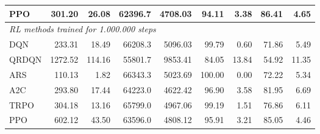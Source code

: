 \begin{samepage}
\begin{center}
\begin{tabular}{l|rr|rr|rr|rr}
    PPO          &   301.20 &    26.08 &    62396.7 &    4708.03 &   94.11 &    3.38 &   86.41 &    4.65 \\
    \midrule
    \multicolumn{9}{l}{\textit{RL methods trained for 1.000.000 steps}} \\
    \midrule
    DQN          &   233.31 &    18.49 &    66208.3 &    5096.03 &   99.79 &    0.60 &   71.86 &    5.49 \\
    QRDQN        &  1272.52 &   114.16 &    55801.7 &    9853.41 &   84.05 &   13.84 &   54.92 &   11.35 \\
    ARS          &   110.13 &     1.82 &    66343.3 &    5023.69 &  100.00 &    0.00 &   72.22 &    5.34 \\
    A2C          &   293.80 &    17.44 &    64223.0 &    4622.42 &   96.90 &    3.58 &   81.95 &    6.69 \\
    TRPO         &   304.18 &    13.16 &    65799.0 &    4967.06 &   99.19 &    1.51 &   76.86 &    6.11 \\
    PPO          &   602.12 &    43.50 &    63596.0 &    4808.12 &   95.91 &    3.21 &   85.05 &    4.46 \\
    \bottomrule
  \end{tabular}
\end{center}
\end{samepage}

